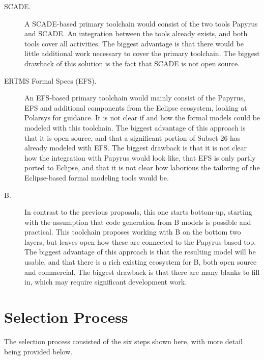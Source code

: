 \begin{description}

\item[SCADE.] A SCADE-based primary toolchain would consist of the two tools Papyrus and SCADE.  An integration between the tools already exists, and both tools cover all activities.  The biggest advantage is that there would be little additional work necessary to cover the primary toolchain.  The biggest drawback of this solution is the fact that SCADE is not open source.

\item[ERTMS Formal Specs (EFS).] An EFS-based primary toolchain would mainly consist of the Papyrus, EFS and additional components from the Eclipse ecosystem, looking at Polarsys for guidance.  It is not clear if and how the formal models could be modeled with this toolchain.  The biggest advantage of this approach is that it is open source, and that a significant portion of Subset 26 has already modeled with EFS.  The biggest drawback is that it is not clear how the integration with Papyrus would look like, that EFS is only partly ported to Eclipse, and that it is not clear how laborious the tailoring of the Eclipse-based formal modeling tools would be.

\item[B.] In contrast to the previous proposals, this one starts bottom-up, starting with the assumption that code generation from B models is possible and practical.   This toolchain proposes working with B on the bottom two layers, but leaves open how these are connected to the Papyrus-based top.  The biggest advantage of this approach is that the resulting model will be usable, and that there is a rich existing ecosystem for B, both open source and commercial.  The biggest drawback is that there are many blanks to fill in, which may require significant development work.

\end{description}

\section{Selection Process}

The selection process consisted of the six steps shown here, with more detail being provided below.

